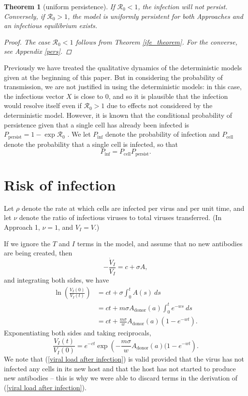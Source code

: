 \documentclass[]{elsarticle}
\newcommand{\Pcell}{P_{\text{cell}}}
\newcommand{\Pinf}{P_{\text{inf}}}
\newcommand{\Ppersist}{P_{\text{persist}}}
\newcommand{\Adonor}{A_{\text{donor}}}
\newcommand{\BRN}{\mathcal{R}_0}
\newtheorem{theorem}{Theorem}[section]
\theoremstyle{definition}
\begin{document}
\begin{theorem}[uniform persistence]
\label{IE}
    If $\BRN < 1$, the infection will not persist. Conversely, if $\BRN > 1$, the model is uniformly persistent for both Approaches and an infectious equilibrium exists.
\begin{proof}
    The case $\BRN < 1$ follows from Theorem \ref{ife_theorem}. For the converse, see Appendix \ref{pers}.
\end{proof}
\end{theorem}

Previously we have treated the qualitative dynamics of the deterministic models given at the beginning of this paper. But in considering the probability of transmission, we are not justified in using the deterministic models: in this case, the infectious vector $X$ is close to $0$, and so it is plausible that the infection would resolve itself even if $\BRN > 1$ due to effects not considered by the deterministic model. However, it is known that the conditional probability of persistence given that a single cell has already been infected is $\Ppersist = 1 - \exp \BRN$ \cite{pPersist}. We let $\Pinf$ denote the probability of infection and $\Pcell$ denote the probability that a single cell is infected, so that
$$\Pinf = \Pcell \Ppersist.$$


\section{Risk of infection}

Let $\rho$ denote the rate at which cells are infected per virus and per unit time, and let $\nu$ denote the ratio of infectious viruses to total viruses transferred. (In Approach 1, $\nu = 1$, and $V_I = V$.)

If we ignore the $T$ and $I$ terms in the model, and assume that no new antibodies are being created, then
$$-\frac{\dot V_I}{V_I} = c + \sigma A,$$
and integrating both sides, we have
\begin{align*}
    \ln\left(\frac{V_I(0)}{V_I(t)}\right) &= ct + \sigma \int_0^t A(s) ~ds\\
    &= ct + m\sigma \Adonor(a) \int_0^t e^{-ws}~ds \\
    &= ct + \frac{m\sigma}{w} \Adonor(a) (1 - e^{-wt}).
\end{align*}
Exponentiating both sides and taking reciprocals,
\begin{equation}
\label{viral load after infection}
    \frac{V_I(t)}{V_I(0)} = e^{-ct}\exp\left(-\frac{m\sigma}{w}\Adonor(a)(1-e^{-wt}\right).
\end{equation}
We note that (\ref{viral load after infection}) is valid provided that the virus has not infected any cells in its new host and that the host has not started to produce new antibodies -- this is why we were able to discard terms in the derivation of (\ref{viral load after infection}).
\end{document}

